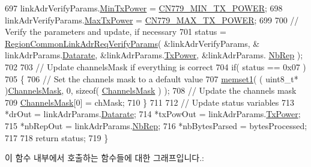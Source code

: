 \begin{DoxyCode}
697     linkAdrVerifyParams.\mbox{\hyperlink{structs_region_common_link_adr_req_verify_params_afe7bf10e9fadd8be6beb31e8b91a1ba2}{MinTxPower}} = \mbox{\hyperlink{group___r_e_g_i_o_n_c_n779_gab0e266968cb85199e9002eb1d3c5a719}{CN779\_MIN\_TX\_POWER}};
698     linkAdrVerifyParams.\mbox{\hyperlink{structs_region_common_link_adr_req_verify_params_a118829b26fb7d913d4202d5d06356a95}{MaxTxPower}} = \mbox{\hyperlink{group___r_e_g_i_o_n_c_n779_ga8a70356561f3416db21a1e93b4ee4ae9}{CN779\_MAX\_TX\_POWER}};
699 
700     \textcolor{comment}{// Verify the parameters and update, if necessary}
701     status = \mbox{\hyperlink{group___r_e_g_i_o_n_c_o_m_m_o_n_ga2c87f98f09793dc7fa63a9801feeed73}{RegionCommonLinkAdrReqVerifyParams}}( &linkAdrVerifyParams, &
      linkAdrParams.\mbox{\hyperlink{structs_region_common_link_adr_params_ae2f6080f3aa0e9485c55513ca56bb24d}{Datarate}}, &linkAdrParams.\mbox{\hyperlink{structs_region_common_link_adr_params_a037b4f849fa8ed4aa1d3c58aef2b28ec}{TxPower}}, &linkAdrParams.
      \mbox{\hyperlink{structs_region_common_link_adr_params_a3b99538671d86dbfe2f6754ce6f9577a}{NbRep}} );
702 
703     \textcolor{comment}{// Update channelsMask if everything is correct}
704     \textcolor{keywordflow}{if}( status == 0x07 )
705     \{
706         \textcolor{comment}{// Set the channels mask to a default value}
707         \mbox{\hyperlink{utilities_8c_a272ed6d691263d9762c98ed720b1fa3a}{memset1}}( ( uint8\_t* )\mbox{\hyperlink{_region_c_n779_8c_a2188957b5ca6af8092154d7ccbfa5757}{ChannelsMask}}, 0, \textcolor{keyword}{sizeof}( 
      \mbox{\hyperlink{_region_c_n779_8c_a2188957b5ca6af8092154d7ccbfa5757}{ChannelsMask}} ) );
708         \textcolor{comment}{// Update the channels mask}
709         \mbox{\hyperlink{_region_c_n779_8c_a2188957b5ca6af8092154d7ccbfa5757}{ChannelsMask}}[0] = chMask;
710     \}
711 
712     \textcolor{comment}{// Update status variables}
713     *drOut = linkAdrParams.\mbox{\hyperlink{structs_region_common_link_adr_params_ae2f6080f3aa0e9485c55513ca56bb24d}{Datarate}};
714     *txPowOut = linkAdrParams.\mbox{\hyperlink{structs_region_common_link_adr_params_a037b4f849fa8ed4aa1d3c58aef2b28ec}{TxPower}};
715     *nbRepOut = linkAdrParams.\mbox{\hyperlink{structs_region_common_link_adr_params_a3b99538671d86dbfe2f6754ce6f9577a}{NbRep}};
716     *nbBytesParsed = bytesProcessed;
717 
718     \textcolor{keywordflow}{return} status;
719 \}
\end{DoxyCode}
이 함수 내부에서 호출하는 함수들에 대한 그래프입니다.\+:
\mbox{\label{group___r_e_g_i_o_n_c_n779_gab4c6ffa72f1da0e2ef40431ab7fd72fa}} 
